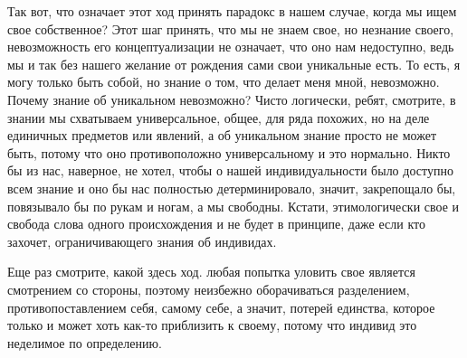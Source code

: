 Так вот, что означает этот ход принять
парадокс в нашем случае, когда мы ищем свое собственное? Этот шаг принять, что
мы не знаем свое, но незнание своего, невозможность его концептуализации не
означает, что оно нам недоступно, ведь мы и так без нашего желание от рождения
сами свои уникальные есть. То есть, я могу только быть собой, но знание о том,
что делает меня мной, невозможно. Почему знание об уникальном невозможно? Чисто
логически, ребят, смотрите, в знании мы схватываем универсальное, общее, для
ряда похожих, но на деле единичных предметов или явлений, а об уникальном знание
просто не может быть, потому что оно противоположно универсальному и это
нормально. Никто бы из нас, наверное, не хотел, чтобы о нашей индивидуальности
было доступно всем знание и оно бы нас полностью детерминировало, значит,
закрепощало бы, повязывало бы по рукам и ногам, а мы свободны. Кстати,
этимологически свое и свобода слова одного происхождения и не будет в принципе,
даже если кто захочет, ограничивающего знания об индивидах. 

Еще раз смотрите,
какой здесь ход. любая попытка уловить свое является смотрением со стороны,
поэтому неизбежно оборачиваться разделением, противопоставлением себя, самому
себе, а значит, потерей единства, которое только и может хоть как-то приблизить
к своему, потому что индивид это неделимое по определению. 


